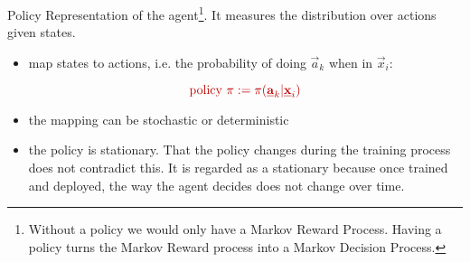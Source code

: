 \begin{frame}

\begin{block}{\textcolor{policy}{Policy}}
Representation of the agent\footnote{
Without a policy we would only have a Markov Reward Process.
Having a policy turns the Markov Reward process into a Markov Decision Process.
}. It measures the distribution over actions given states.
\begin{itemize}
\item map states to actions, i.e. the probability of doing $\vec a_k$ when in $\vec x_i$:

\begin{equation}
\color{policy}
\text{policy }\pi := \pi(\vec a_k | \vec x_i)
\end{equation}
\item the mapping can be stochastic or deterministic
\item the policy is stationary. That the policy changes during the training process does not contradict this.
It is regarded as a stationary because once trained and deployed, the way the agent decides does not change over time.
\end{itemize}

\end{block}

\end{frame}
